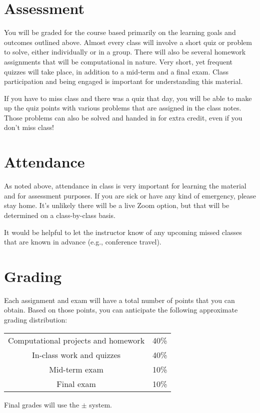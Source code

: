\documentclass[10pt,letterpaper]{article}
\begin{document}
\section{Assessment}

You will be graded for the course based primarily on the learning goals and outcomes outlined above. Almost every class will involve a short quiz or problem to solve, either individually or in a group.    There will also be several homework assignments that will be computational in nature. Very short, yet frequent quizzes will take place, in addition to a mid-term and a final exam. Class participation and being engaged is important for understanding this material.

If you have to miss class and there was a quiz that day, you will be able to make up the quiz points with various problems that are assigned in the class notes. Those problems can also be solved and handed in for extra credit, even if you don't miss class!

\section{Attendance}

As noted above, attendance in class is very important for learning the material and for assessment purposes. If you are sick or have any kind of emergency, please stay home. It's unlikely there will be a live Zoom option, but that will be determined on a class-by-class basis.

It would be helpful to let the instructor know of any upcoming missed classes that are known in advance (e.g., conference travel). 

\section{Grading}
Each assignment and exam will have a total number of points that you can obtain. Based on those points, you can anticipate the  following approximate grading distribution:
\begin{center}
  \begin{tabular}{|c|c|}
    \hline
    Computational projects and homework & 40\% \\
    In-class work and quizzes & 40\% \\
    Mid-term exam & 10\% \\
    Final exam & 10\% \\
    \hline
  \end{tabular}
\end{center}
Final grades will use the $\pm$ system.
\end{document}
